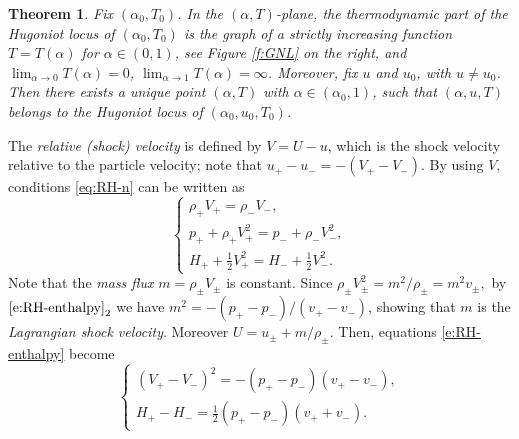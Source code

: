\documentclass[10pt,a4paper]{article}
\newtheorem{theorem}{Theorem}[section]
\numberwithin{equation}{section}
\begin{document}
\begin{theorem}\label{thm:Hugoniot curve alpha T}
Fix $(\alpha_0,T_0)$. In the $(\alpha, T)$-plane, the thermodynamic part of the Hugoniot locus of $(\alpha_0,T_0)$ is the graph of a strictly increasing function $T=T(\alpha)$ for $\alpha\in (0,1)$, see Figure \ref{f:GNL} on the right, and $\lim_{\alpha\to0}T(\alpha)=0$, $\lim_{\alpha\to1}T(\alpha)=\infty$.
Moreover, fix  $u$ and $u_0$, with $u \ne u_0$. Then there exists a unique point $(\alpha, T)$ with $\alpha \in (\alpha_0,1)$, such that $(\alpha, u, T)$ belongs to the Hugoniot locus of $(\alpha_0,u_0,T_0)$.
 \end{theorem} 


The {\it relative (shock)  velocity\/} is defined by $V = U - u$, which is the shock velocity relative to the particle velocity; note that $u_+ - u_- = -(V_+ - V_-).$ By using $V$, conditions \eqref{eq:RH-n} can be written as
\begin{equation}\label{e:RH-enthalpy}
\left\{
\begin{array}{l}  
\rho_+ V_+ = \rho_-V_-, \\
p_+ + \rho_+ V_+^2= p_- + \rho_- V_-^2,\\
H_+ + \frac{1}{2}V_+^2 = H_- + \frac{1}{2}V_-^2. 
\end{array}
\right.
\end{equation} 
Note that the {\it mass flux\/} $m = \rho_{\pm} V_{\pm}$ is constant. Since $\rho_{\pm}V_{\pm}^2 = m^2/\rho_{\pm} = m^2 v_{\pm},$ by $\eqref{e:RH-enthalpy}_2$ we have $m^2 = -(p_{+} - p_{-})/(v_{+} - v_{-})$, showing that $m$ is the {\it Lagrangian shock velocity\/}. Moreover
\(U = u_{\pm} + m/\rho_{\pm}.\)
Then, equations \eqref{e:RH-enthalpy} become  
\begin{equation}\label{eq:Rankine-Hugoniot V}
\left\{\begin{array}{l}
               (V_+ - V_-)^2 =- (p_+ - p_-)(v_+ - v_-),
               \\
               H_+ -  H_- = \frac{1}{2}(p_+ - p_-)(v_+ + v_-).
        \end{array}\right.
\end{equation}
\par
\end{document}
